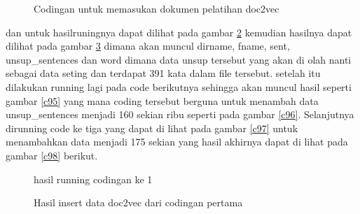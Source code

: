 \begin{enumerate}
\begin{figure}[!htbp]
      \caption{Codingan untuk memasukan dokumen pelatihan doc2vec}
      \label{c92}
      \end{figure}

dan untuk hasilruningnya dapat dilihat pada gambar \ref{c93} kemudian hasilnya dapat dilihat pada gambar \ref{c94}  dimana akan muncul dirname, fname, sent, unsup\_sentences dan word dimana data unsup tersebut yang akan di olah nanti sebagai data seting dan terdapat 391 kata dalam file tersebut. setelah itu dilakukan running lagi pada code berikutnya sehingga akan muncul hasil seperti gambar \ref{c95} yang mana coding tersebut berguna untuk menambah data unsup\_sentences menjadi 160 sekian ribu seperti pada gambar \ref{c96}.  Selanjutnya dirunning code ke tiga yang dapat di lihat pada gambar \ref{c97} untuk  menambahkan data menjadi 175 sekian yang hasil akhirnya dapat di lihat pada gambar \ref{c98}  berikut.\par

\begin{figure}[!htbp]
      \caption{hasil running codingan ke 1}
      \label{c93}
      \end{figure}

\begin{figure}[!htbp]
      \caption{Hasil insert data doc2vec dari codingan pertama}
      \label{c94}
      \end{figure}


\end{enumerate}
